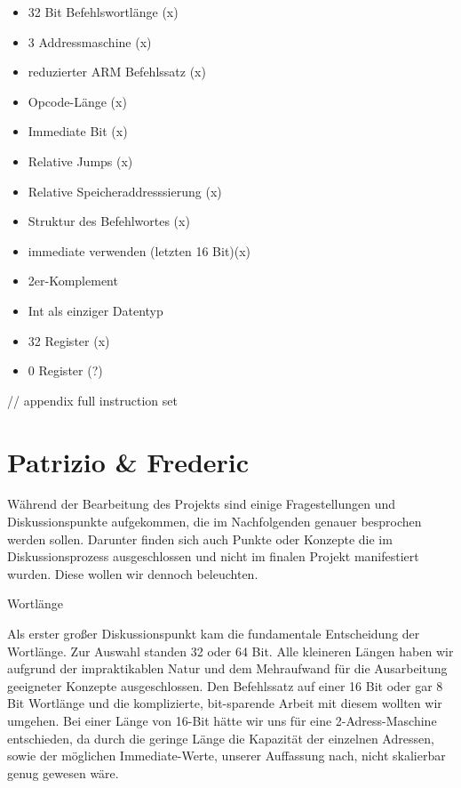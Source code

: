\documentclass[paper=a4,fontsize=12pt]{scrreprt}
\begin{document}
\begin{itemize}
    \item 32 Bit Befehlswortlänge (x)
    \item 3 Addressmaschine (x)
    \item reduzierter ARM Befehlssatz (x)
    \item Opcode-Länge (x)
    \item Immediate Bit (x)
    \item Relative Jumps (x)
    \item Relative Speicheraddresssierung (x)
    \item Struktur des Befehlwortes (x)
    \item immediate verwenden (letzten 16 Bit)(x)    
    \item 2er-Komplement
    \item Int als einziger Datentyp    
    \item 32 Register (x)
    \item 0 Register (?)

\end{itemize}

// appendix full instruction set

\newpage
\section{Patrizio & Frederic}

Während der Bearbeitung des Projekts sind einige Fragestellungen und Diskussionspunkte aufgekommen, die im Nachfolgenden genauer besprochen werden sollen. Darunter finden sich auch Punkte oder Konzepte die im Diskussionsprozess ausgeschlossen und nicht im finalen Projekt manifestiert wurden. Diese wollen wir dennoch beleuchten.

Wortlänge

Als erster großer Diskussionspunkt kam die fundamentale Entscheidung der Wortlänge. Zur Auswahl standen 32 oder 64 Bit. Alle kleineren Längen haben wir aufgrund der impraktikablen Natur und dem Mehraufwand für die Ausarbeitung geeigneter Konzepte ausgeschlossen. Den Befehlssatz auf einer 16 Bit oder gar 8 Bit Wortlänge und die komplizierte, bit-sparende Arbeit mit diesem wollten wir umgehen. Bei einer Länge von 16-Bit hätte wir uns für eine 2-Adress-Maschine entschieden, da durch die geringe Länge die Kapazität der einzelnen Adressen, sowie der möglichen Immediate-Werte, unserer Auffassung nach, nicht skalierbar genug gewesen wäre.
\end{document}
